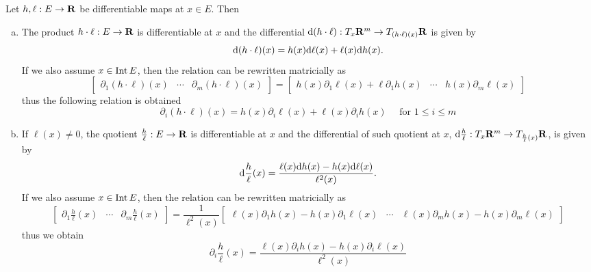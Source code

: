 \begin{theorem}\label{thm: diff-prod-div}
  Let \(h, \ell: E \to \mathbf{R}\) be differentiable maps at \(x \in E\). Then
  \begin{enumerate}[(a)]
    \item The product \(h \cdot \ell: E \to \mathbf{R}\) is differentiable at \(x\) and
      the differential \(\mathrm{d}(h \cdot \ell): T_x\mathbf{R}^m \to T_{(h \cdot
      \ell)(x)}\mathbf{R}\) is given by
      \begin{equation}
        \mathrm{d}(h \cdot \ell)(x) = h(x) \mathrm{d} \ell(x) + \ell(x) \mathrm{d} h(x).
      \end{equation}
      If we also assume \(x \in \operatorname{Int} E\), then the relation can be rewritten
      matricially as
      \[
        \begin{bmatrix}
          \partial_1 (h \cdot \ell)(x) &\cdots &\partial_m (h \cdot \ell)(x)
        \end{bmatrix}
        =
        \begin{bmatrix}
          h(x) \partial_1 \ell(x) + \ell \partial_1 h(x)
          &\cdots
          &h(x) \partial_m \ell(x)
        \end{bmatrix}
      \]
      thus the following relation is obtained
      \begin{equation}
        \partial_i (h \cdot \ell)(x) =
        h(x) \partial_i \ell(x) + \ell(x) \partial_i h(x)
        \quad \text{ for } 1 \leq i \leq m
      \end{equation}
    \item If \(\ell(x) \neq 0\), the quotient \(\frac h \ell: E \to \mathbf{R}\) is
      differentiable at \(x\) and the differential of such quotient at \(x\),
      \(\mathrm{d} \frac h \ell: T_x\mathbf{R}^m \to T_{\frac h \ell (x)}\mathbf{R}\), is given by
      \begin{equation}
        \mathrm{d} \frac h \ell (x) =
        \frac{\ell(x) \mathrm{d} h(x) - h(x) \mathrm{d} \ell(x)}{\ell^2(x)}.
      \end{equation}
      If we also assume \(x \in \operatorname{Int} E\), then the relation can be rewritten
      matricially as
      \[
        \begin{bmatrix}
          \partial_1 \frac h \ell (x) &\cdots &\partial_m \frac h \ell (x)
        \end{bmatrix}
        =
        \frac 1 {\ell^2(x)}
        \begin{bmatrix}
        \ell(x) \partial_1 h(x) - h(x) \partial_1 \ell(x)
        &\cdots
        &\ell(x) \partial_m h(x) - h(x) \partial_m \ell(x)
        \end{bmatrix}
      \]
      thus we obtain
      \begin{equation}
        \partial_i \frac h \ell (x) =
        \frac{\ell(x) \partial_i h(x) - h(x) \partial_i \ell(x)}{\ell^2(x)}
      \end{equation}
  \end{enumerate}
\end{theorem}

